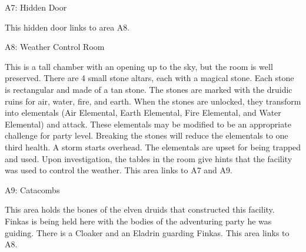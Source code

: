 A7: Hidden Door

This hidden door links to area A8.

A8: Weather Control Room

This is a tall chamber with an opening up to the sky, but the room is well preserved.
There are 4 small stone altars, each with a magical stone.
Each stone is rectangular and made of a tan stone.
The stones are marked with the druidic ruins for air, water, fire, and earth.
When the stones are unlocked, they transform into elementals (Air Elemental, Earth Elemental, Fire Elemental, and Water Elemental) and attack.
These elementals may be modified to be an appropriate challenge for party level.
Breaking the stones will reduce the elementals to one third health.
A storm starts overhead.
The elementals are upset for being trapped and used.
Upon investigation, the tables in the room give hints that the facility was used to control the weather.
This area links to A7 and A9.

A9: Catacombs

This area holds the bones of the elven druids that constructed this facility.
Finkas is being held here with the bodies of the adventuring party he was guiding.
There is a Cloaker and an Eladrin guarding Finkas.
This area links to A8.

